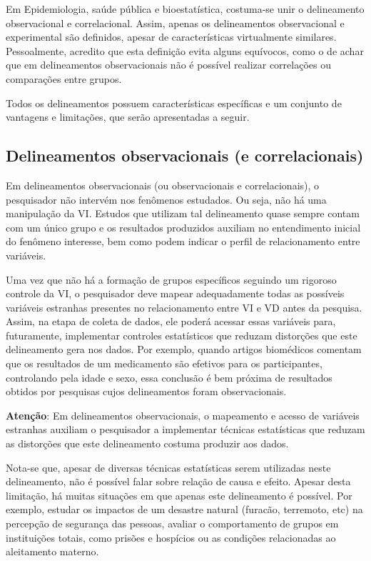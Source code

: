 \documentclass[
]{book}
\begin{document}
Em Epidemiologia, saúde pública e bioestatística, costuma-se unir o delineamento observacional e correlacional. Assim, apenas os delineamentos observacional e experimental são definidos, apesar de características virtualmente similares. Pessoalmente, acredito que esta definição evita alguns equívocos, como o de achar que em delineamentos observacionais não é possível realizar correlações ou comparações entre grupos.

Todos os delineamentos possuem características específicas e um conjunto de vantagens e limitações, que serão apresentadas a seguir.

\hypertarget{delineamentos-observacionais-e-correlacionais}{%
\subsection{Delineamentos observacionais (e correlacionais)}\label{delineamentos-observacionais-e-correlacionais}}

Em delineamentos observacionais (ou observacionais e correlacionais), o pesquisador não intervém nos fenômenos estudados. Ou seja, não há uma manipulação da VI. Estudos que utilizam tal delineamento quase sempre contam com um único grupo e os resultados produzidos auxiliam no entendimento inicial do fenômeno interesse, bem como podem indicar o perfil de relacionamento entre variáveis.

Uma vez que não há a formação de grupos específicos seguindo um rigoroso controle da VI, o pesquisador deve mapear adequadamente todas as possíveis variáveis estranhas presentes no relacionamento entre VI e VD antes da pesquisa. Assim, na etapa de coleta de dados, ele poderá acessar essas variáveis para, futuramente, implementar controles estatísticos que reduzam distorções que este delineamento gera nos dados. Por exemplo, quando artigos biomédicos comentam que os resultados de um medicamento são efetivos para os participantes, controlando pela idade e sexo, essa conclusão é bem próxima de resultados obtidos por pesquisas cujos delineamentos foram observacionais.

\textbf{Atenção}: Em delineamentos observacionais, o mapeamento e acesso de variáveis estranhas auxiliam o pesquisador a implementar técnicas estatísticas que reduzam as distorções que este delineamento costuma produzir aos dados.

Nota-se que, apesar de diversas técnicas estatísticas serem utilizadas neste delineamento, não é possível falar sobre relação de causa e efeito. Apesar desta limitação, há muitas situações em que apenas este delineamento é possível. Por exemplo, estudar os impactos de um desastre natural (furacão, terremoto, etc) na percepção de segurança das pessoas, avaliar o comportamento de grupos em instituições totais, como prisões e hospícios ou as condições relacionadas ao aleitamento materno.
\end{document}
